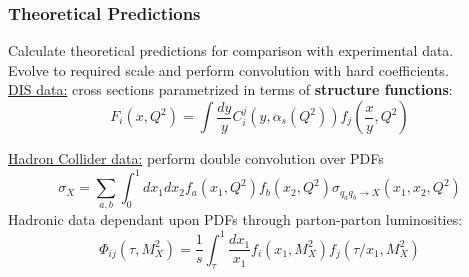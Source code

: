 \documentclass[10pt]{beamer}
\newcommand{\be}{\begin{equation*}}
\newcommand{\ee}{\end{equation*}}
\begin{document}
\begin{frame}
\begin{columns}
\begin{column}{0.4\textwidth}
\begin{itemize}
\end{itemize}

\end{column}
\end{columns}
\end{frame}


\begin{frame}
\frametitle{Theoretical Predictions}
Calculate theoretical predictions for comparison with experimental data.\\
Evolve to required scale and perform convolution with hard coefficients.\\
\vskip10pt
\underline{DIS data:} cross sections parametrized in terms of  \textbf{structure functions}:
\be F_i(x,Q^2) = \int\frac{dy}{y} C_{i}^{j}(y,\alpha_s(Q^2))f_j\left(\frac{x}{y},Q^2\right) \ee

\underline{Hadron Collider data:} perform double convolution over PDFs
\be \sigma_X= \sum_{a,b} \int_0^1 dx_1dx_2 f_a(x_1,Q^2)f_b(x_2,Q^2)\sigma_{q_aq_b \to X} \left( x_1,x_2,Q^2 \right) \ee
Hadronic data dependant upon PDFs through parton-parton luminosities:
\be \Phi_{ij}(\tau,M_X^2) = \frac{1}{s}\int_\tau^1\frac{dx_1}{x_1} f_i(x_1,M_X^2)f_j(\tau/x_1,M_X^2) \ee

\end{frame}
\end{document}
